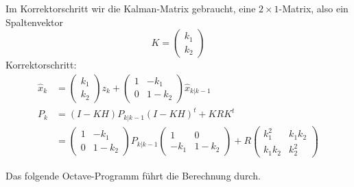 \begin{loesung}
\begin{teilaufgaben}
Im Korrektorschritt wir die Kalman-Matrix gebraucht, eine
$2\times 1$-Matrix, also ein Spaltenvektor
\[
K=
\begin{pmatrix}k_1\\k_2\end{pmatrix}
\]
Korrektorschritt:
\begin{align*}
\hat x_k
&=
\begin{pmatrix}k_1\\k_2\end{pmatrix}z_k
+
\begin{pmatrix}
1&-k_1\\
0&1-k_2
\end{pmatrix}
\hat x_{k|k-1}
\\
P_k
&=
(I-KH)P_{k|k-1}(I-KH)^t+KRK^t
\\
&=
\begin{pmatrix}
1&-k_1\\
0&1-k_2
\end{pmatrix}
P_{k|k-1}
\begin{pmatrix}
1&0\\
-k_1&1-k_2
\end{pmatrix}
+
R
\begin{pmatrix}
k_1^2&k_1k_2\\
k_1k_2&k_2^2
\end{pmatrix}
\end{align*}
\item
Das folgende Octave-Programm führt die Berechnung durch.
\begin{small}
\end{small}
\qedhere
\end{teilaufgaben}
\end{loesung}

